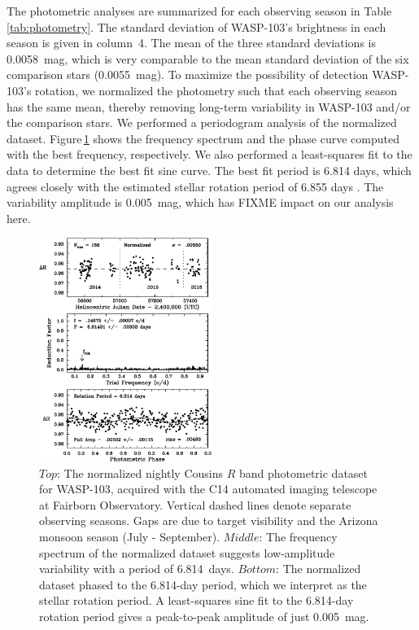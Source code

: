 \documentclass[twocolumn]{aastex61}
\begin{document}
The photometric analyses are summarized for each observing season in Table\,\ref{tab:photometry}.  The standard deviation of WASP-103's brightness in each season is given in column~4.  The mean of the three standard deviations is 0.0058~mag, which is very comparable to the mean standard deviation of the six comparison stars (0.0055~mag).  To maximize the possibility of detection WASP-103's rotation, we normalized the photometry such that each observing season has the same mean, thereby removing long-term variability in WASP-103 and/or the comparison stars. We performed a periodogram analysis of the normalized dataset. Figure\,\ref{fig:photometry} shows the frequency spectrum and the phase curve computed with the best frequency, respectively.  We also performed a least-squares fit to the data to determine the best fit sine curve. The best fit period is 6.814 days, which agrees closely with the estimated stellar rotation period of 6.855 days \citep{getal2014}.  The variability amplitude is 0.005~mag, which has FIXME impact on our analysis here.


\begin{figure}
\includegraphics[width = 0.5\textwidth]{Figures/photometry.eps}
\caption{$Top$: The normalized nightly Cousins $R$ band photometric dataset for WASP-103, acquired with the C14 automated imaging telescope at Fairborn Observatory. Vertical dashed lines denote separate observing seasons. Gaps are due to target visibility and the Arizona monsoon season (July - September). $Middle$: The frequency spectrum of the normalized dataset suggests low-amplitude variability with a period of 6.814~days. $Bottom$: The normalized dataset phased to the 6.814-day period, which we interpret as the stellar rotation period. A least-squares sine fit to the 6.814-day rotation period gives a peak-to-peak amplitude of just 0.005~mag.}
\label{fig:photometry}
\end{figure}
\end{document}
